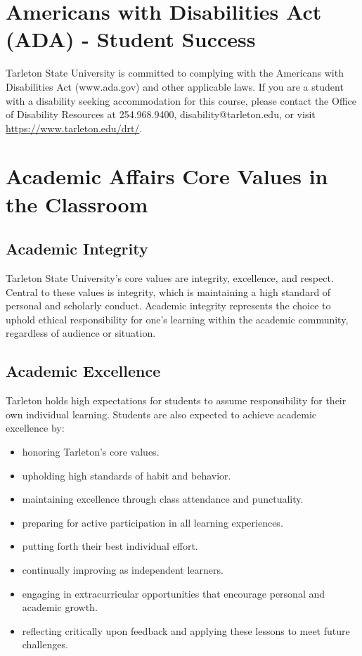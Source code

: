 \documentclass[10pt]{article}
\begin{document}
\section*{Americans with Disabilities Act (ADA) - Student Success}
\label{sec:org167c871}

Tarleton State University is committed to complying with the Americans with Disabilities Act (www.ada.gov) and other applicable laws. If you are a student with a disability seeking accommodation for this course, please contact the Office of Disability Resources at 254.968.9400, disability@tarleton.edu, or visit \url{https://www.tarleton.edu/drt/}.  

\section*{Academic Affairs Core Values in the Classroom}
\label{sec:org4962add}

\subsection*{Academic Integrity}
\label{sec:orgf568124}
Tarleton State University's core values are integrity, excellence, and respect. Central to these values is integrity, which is maintaining a high standard of personal and scholarly conduct. Academic integrity represents the choice to uphold ethical responsibility for one’s learning within the academic community, regardless of audience or situation.

\subsection*{Academic Excellence}
\label{sec:orgb306d8b}
Tarleton holds high expectations for students to assume responsibility for their own individual learning.  Students are also expected to achieve academic excellence by:
\begin{itemize}
\item honoring Tarleton’s core values.
\item upholding high standards of habit and behavior.
\item maintaining excellence through class attendance and punctuality.
\item preparing for active participation in all learning experiences.
\item putting forth their best individual effort.
\item continually improving as independent learners.
\item engaging in extracurricular opportunities that encourage personal and academic growth.
\item reflecting critically upon feedback and applying these lessons to meet future challenges.
\end{itemize}
\end{document}
